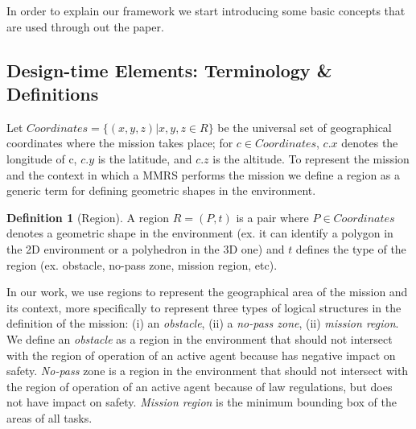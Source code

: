 \documentclass[journal]{IEEEtran}
\theoremstyle{definition}
\newtheorem{definition}{Definition}
\newcommand{\ugh}[1]{\textcolor{red}{\uwave{#1}}} %
\newcommand\patrizio[1]{\nb{Patrizio}{#1}}
\newcommand\ivano[1]{\nb{Ivano}{#1}}
\begin{document}

In order to explain our framework we
start introducing some basic concepts
that are used through out the paper.

\subsection{Design-time Elements: Terminology \& Definitions}


Let $Coordinates = \{(x,y,z) | x,y,z \in R\}$  be the universal set of geographical coordinates where the mission takes place; for $c \in Coordinates$, $c.x$ denotes the longitude of c, $c.y$ is the latitude,
and $c.z$ is the altitude. 
To represent the mission and the context in which a MMRS performs the mission we define a region as a generic term for defining geometric shapes in the environment. 

\begin{definition}[Region]
A region $R=(P, t)$ is a pair where $P \in Coordinates$ 
denotes a geometric shape in the environment (ex. it can identify a polygon in the 2D environment or a polyhedron in the 3D one) and $t$  defines the type of the region (ex. obstacle,  no-pass zone, mission region, etc).
\end{definition}

In our work, we use regions to represent the geographical area of the mission and its context, more specifically to represent three types of logical structures in the definition of the mission: (i) an \textit{obstacle}, (ii) a \textit{no-pass zone}, (ii) \textit{mission region}.
We define an \textit{obstacle} as a region in the environment that should not intersect with the region of operation of an active agent because has negative impact on safety.  \textit{No-pass} zone is a region in the environment that should not intersect with the region of operation of an active agent because of law regulations, but does not have impact on safety.  \textit{Mission region} is the minimum bounding box of the areas of all tasks. 
\end{document}
